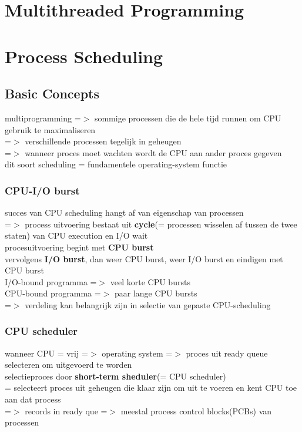 \documentclass{report}
\begin{document}
\chapter{Multithreaded Programming}
\chapter{Process Scheduling}
\section{Basic Concepts}
multiprogramming =$>$ sommige processen die de hele tijd runnen om CPU gebruik te maximaliseren
\\=$>$ verschillende processen tegelijk in geheugen
\\=$>$ wanneer proces moet wachten wordt de CPU aan ander proces gegeven
\\dit soort scheduling = fundamentele operating-system functie
\subsection{CPU-I/O burst}
succes van CPU scheduling hangt af van eigenschap van processen
\\=$>$ process uitvoering bestaat uit \textbf{cycle}(= processen wisselen af tussen de twee staten) van CPU execution en I/O wait
\\procesuitvoering begint met \textbf{CPU burst}
\\vervolgens \textbf{I/O burst}, dan weer CPU burst, weer I/O burst en eindigen met CPU burst
\\I/O-bound programma =$>$ veel korte CPU bursts
\\CPU-bound programma =$>$ paar lange CPU bursts
\\=$>$ verdeling kan belangrijk zijn in selectie van gepaste CPU-scheduling
\subsection{CPU scheduler}
wanneer CPU = vrij =$>$ operating system =$>$ proces uit ready queue selecteren om uitgevoerd te worden
\\selectieproces door \textbf{short-term sheduler}(= CPU scheduler)
\\= selecteert proces uit geheugen die klaar zijn om uit te voeren en kent CPU toe aan dat process
\\=$>$ records in ready que =$>$ meestal process control blocks(PCBs) van processen
\end{document}
